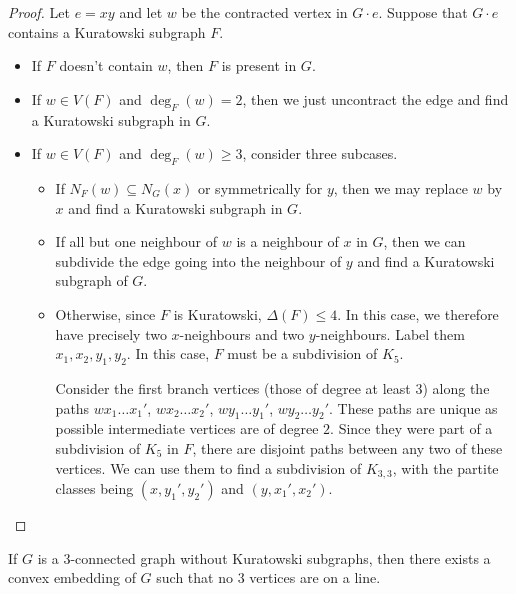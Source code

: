 \begin{proof}
  Let $e = xy$ and let $w$ be the contracted vertex in $G \cdot e$.
  Suppose that $G \cdot e$ contains a Kuratowski subgraph $F$.
  \begin{itemize}
  \item If $F$ doesn't contain $w$, then $F$ is present in $G$.
  \item If $w \in V(F)$ and $\deg_F(w) = 2$, then we just uncontract the edge
	and find a Kuratowski subgraph in $G$.
  \item If $w \in V(F)$ and $\deg_F(w) \ge 3$, consider three subcases.
	\begin{itemize}
	\item If $N_F(w) \subseteq N_G(x)$ or symmetrically for $y$, then we may
	  replace $w$ by $x$ and find a Kuratowski subgraph in $G$.
	\item If all but one neighbour of $w$ is a neighbour of $x$ in $G$, then we
	  can subdivide the edge going into the neighbour of $y$ and find a
	  Kuratowski subgraph of $G$.
	\item Otherwise, since $F$ is Kuratowski, $\Delta(F) \le 4$.
	  In this case, we therefore have precisely two $x$-neighbours and two
	  $y$-neighbours.
	  Label them $x_1, x_2, y_1, y_2$.
	  In this case, $F$ must be a subdivision of $K_5$.

	  Consider the first branch vertices (those of degree at least $3$) along
	  the paths $w x_1 \ldots x_1'$, $w x_2 \ldots x_2'$, $w y_1 \ldots y_1'$,
	  $w y_2 \ldots y_2'$.
	  These paths are unique as possible intermediate vertices are of degree
	  $2$.
	  Since they were part of a subdivision of $K_5$ in $F$, there are disjoint
	  paths between any two of these vertices.
	  We can use them to find a subdivision of $K_{3,3}$, with the partite
	  classes being $(x,y_1', y_2')$ and $(y, x_1', x_2')$.
	  \qedhere
	\end{itemize}
  \end{itemize}
\end{proof}


\begin{theorem}
  \label{theorem:tg-kuratowski-7}
  If $G$ is a $3$-connected graph without Kuratowski subgraphs, then there
  exists a convex embedding of $G$ such that no $3$ vertices are on a line.
\end{theorem}

